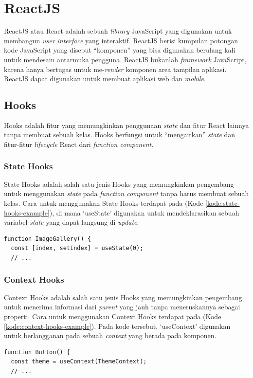 \section{\texorpdfstring{ReactJS~\cite{react-docs}}{ReactJS}}
\label{sec:reactJS}

ReactJS atau React adalah sebuah \textit{library} JavaScript yang digunakan untuk membangun \textit{user interface} yang interaktif. ReactJS berisi kumpulan potongan kode JavaScript yang disebut ``komponen'' yang bisa digunakan berulang kali untuk mendesain antarmuka pengguna. ReactJS bukanlah \textit{framework} JavaScript, karena hanya bertugas untuk me-\textit{render} komponen area tampilan aplikasi. ReactJS dapat digunakan untuk membuat aplikasi web dan \textit{mobile}.

\subsection{Hooks}
\label{subsec:hooks}
Hooks adalah fitur yang memungkinkan penggunaan \textit{state} dan fitur React lainnya tanpa membuat sebuah kelas. Hooks berfungsi untuk ``mengaitkan'' \textit{state} dan fitur-fitur \textit{lifecycle} React dari \textit{function component}.

\subsubsection{State Hooks}
\label{subsubsec:state-hooks}
State Hooks adalah salah satu jenis Hooks yang memungkinkan pengembang untuk menggunakan \textit{state} pada \textit{function component} tanpa harus membuat sebuah kelas. Cara untuk menggunakan State Hooks terdapat pada (Kode \ref{kode:state-hooks-example}), di mana `useState' digunakan untuk mendeklarasikan sebuah variabel \textit{state} yang dapat langsung di \textit{update}.
\begin{lstlisting}[language=HTML, caption=Contoh Potongan Kode State Hooks, label=kode:state-hooks-example]
function ImageGallery() {
  const [index, setIndex] = useState(0);
  // ...
\end{lstlisting}

\subsubsection{Context Hooks}
\label{subsubsec:context-hooks}
Context Hooks adalah salah satu jenis Hooks yang memungkinkan pengembang untuk menerima informasi dari \textit{parent} yang jauh tanpa meneruskannya sebagai properti. Cara untuk menggunakan Context Hooks terdapat pada (Kode \ref{kode:context-hooks-example}). Pada kode tersebut, `useContext' digunakan untuk berlangganan pada sebuah \textit{context} yang berada pada komponen.
\begin{lstlisting}[language=HTML, caption=Contoh Potongan Kode Context Hooks, label=kode:context-hooks-example]
function Button() {
  const theme = useContext(ThemeContext);
  // ...
\end{lstlisting}

